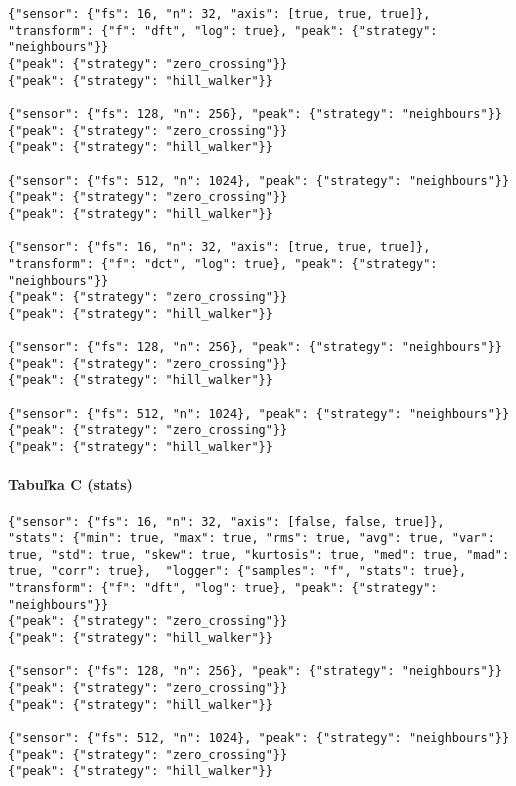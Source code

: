 \begin{lstlisting}[style=messages]
{"sensor": {"fs": 16, "n": 32, "axis": [true, true, true]}, "transform": {"f": "dft", "log": true}, "peak": {"strategy": "neighbours"}}
{"peak": {"strategy": "zero_crossing"}}
{"peak": {"strategy": "hill_walker"}}

{"sensor": {"fs": 128, "n": 256}, "peak": {"strategy": "neighbours"}}
{"peak": {"strategy": "zero_crossing"}}
{"peak": {"strategy": "hill_walker"}}

{"sensor": {"fs": 512, "n": 1024}, "peak": {"strategy": "neighbours"}}
{"peak": {"strategy": "zero_crossing"}}
{"peak": {"strategy": "hill_walker"}}

{"sensor": {"fs": 16, "n": 32, "axis": [true, true, true]}, "transform": {"f": "dct", "log": true}, "peak": {"strategy": "neighbours"}}
{"peak": {"strategy": "zero_crossing"}}
{"peak": {"strategy": "hill_walker"}}

{"sensor": {"fs": 128, "n": 256}, "peak": {"strategy": "neighbours"}}
{"peak": {"strategy": "zero_crossing"}}
{"peak": {"strategy": "hill_walker"}}

{"sensor": {"fs": 512, "n": 1024}, "peak": {"strategy": "neighbours"}}
{"peak": {"strategy": "zero_crossing"}}
{"peak": {"strategy": "hill_walker"}}
\end{lstlisting}

\paragraph{Tabuľka C (stats)}

\begin{lstlisting}[style=messages]
{"sensor": {"fs": 16, "n": 32, "axis": [false, false, true]},  "stats": {"min": true, "max": true, "rms": true, "avg": true, "var": true, "std": true, "skew": true, "kurtosis": true, "med": true, "mad": true, "corr": true},  "logger": {"samples": "f", "stats": true}, "transform": {"f": "dft", "log": true}, "peak": {"strategy": "neighbours"}}
{"peak": {"strategy": "zero_crossing"}}
{"peak": {"strategy": "hill_walker"}}

{"sensor": {"fs": 128, "n": 256}, "peak": {"strategy": "neighbours"}}
{"peak": {"strategy": "zero_crossing"}}
{"peak": {"strategy": "hill_walker"}}

{"sensor": {"fs": 512, "n": 1024}, "peak": {"strategy": "neighbours"}}
{"peak": {"strategy": "zero_crossing"}}
{"peak": {"strategy": "hill_walker"}}
\end{lstlisting}

